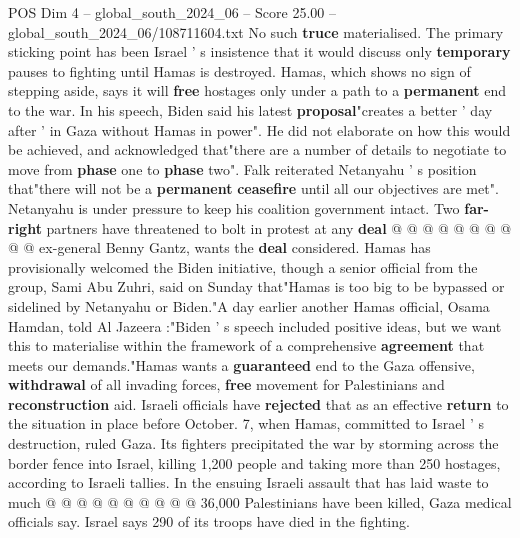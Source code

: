 \begin{textsample}{POS Dim 4 – global\_south\_2024\_06 – Score 25.00 – global\_south\_2024\_06/108711604.txt}
No such \textbf{truce} materialised.
The primary sticking point has been Israel ' s insistence that it would discuss only \textbf{temporary} pauses to fighting until Hamas is destroyed.
Hamas, which shows no sign of stepping aside, says it will \textbf{free} hostages only under a path to a \textbf{permanent} end to the war.
In his speech, Biden said his latest \textbf{proposal}"creates a better ' day after ' in Gaza without Hamas in power".
He did not elaborate on how this would be achieved, and acknowledged that"there are a number of details to negotiate to move from \textbf{phase} one to \textbf{phase} two".
Falk reiterated Netanyahu ' s position that"there will not be a \textbf{permanent} \textbf{ceasefire} until all our objectives are met".
Netanyahu is under pressure to keep his coalition government intact.
Two \textbf{far-right} partners have threatened to bolt in protest at any \textbf{deal} @ @ @ @ @ @ @ @ @ @ ex-general Benny Gantz, wants the \textbf{deal} considered.
Hamas has provisionally welcomed the Biden initiative, though a senior official from the group, Sami Abu Zuhri, said on Sunday that"Hamas is too big to be bypassed or sidelined by Netanyahu or Biden."A day earlier another Hamas official, Osama Hamdan, told Al Jazeera :"Biden ' s speech included positive ideas, but we want this to materialise within the framework of a comprehensive \textbf{agreement} that meets our demands."Hamas wants a \textbf{guaranteed} end to the Gaza offensive, \textbf{withdrawal} of all invading forces, \textbf{free} movement for Palestinians and \textbf{reconstruction} aid.
Israeli officials have \textbf{rejected} that as an effective \textbf{return} to the situation in place before October. 7, when Hamas, committed to Israel ' s destruction, ruled Gaza.
Its fighters precipitated the war by storming across the border fence into Israel, killing 1,200 people and taking more than 250 hostages, according to Israeli tallies.
In the ensuing Israeli assault that has laid waste to much @ @ @ @ @ @ @ @ @ @ 36,000 Palestinians have been killed, Gaza medical officials say.
Israel says 290 of its troops have died in the fighting.

\end{textsample}
